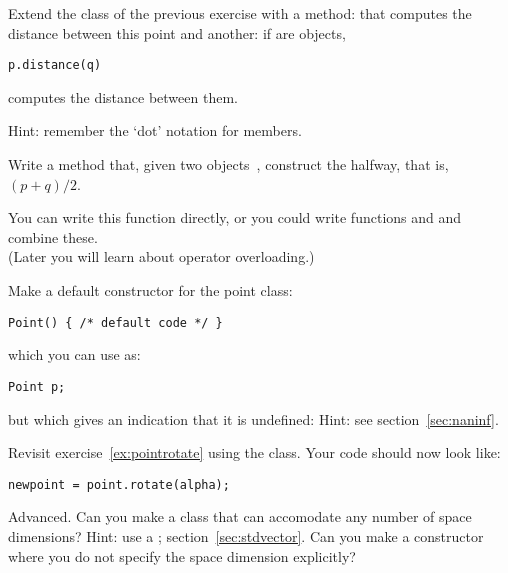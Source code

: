 \begin{exercise}
  \label{ex:geom:pointpoint}
  Extend the  class of the previous exercise with a method:
   that computes the distance between this point and
  another: if  are  objects,
\begin{lstlisting}
p.distance(q) 
\end{lstlisting}
computes the distance between them.

Hint: remember the `dot' notation for members.
\end{exercise}

\begin{exercise}
  \label{ex:geom:pointhalfway}
  Write a method  that, given two 
  objects~, construct the  halfway, that
  is,~$(p+q)/2$.

  You can write this function directly, or you could write functions
   and  and combine these.\\
  (Later you will learn about operator overloading.)
\end{exercise}

\begin{exercise}
  Make a default constructor for the point class:
\begin{lstlisting}
Point() { /* default code */ }
\end{lstlisting}
  which you can use as:
\begin{lstlisting}
Point p;
\end{lstlisting}
but which gives an indication that it is undefined:
%
%
Hint: see section~\ref{sec:naninf}.
\end{exercise}

\begin{exercise}
  \label{ex:pointrotate-class}
  Revisit exercise~\ref{ex:pointrotate} using the 
  class. Your code should now look like:
\begin{lstlisting}
newpoint = point.rotate(alpha);
\end{lstlisting}
\end{exercise}

\begin{exercise}
  Advanced. Can you make a  class that can accomodate any
  number of space dimensions? Hint: use a ;
  section~\ref{sec:stdvector}. Can you make a constructor where you do
  not specify the space dimension explicitly?
\end{exercise}

